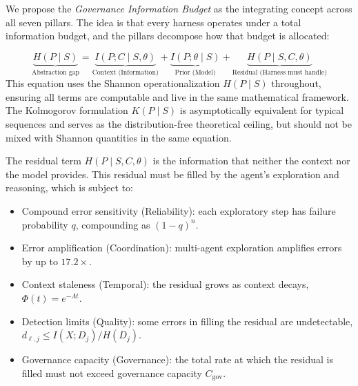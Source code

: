 \documentclass[11pt, a4paper]{googledeepmind}
\begin{document}
We propose the \emph{Governance Information Budget} as the integrating concept across all seven pillars. The idea is that every harness operates under a total information budget, and the pillars decompose how that budget is allocated:

\begin{equation}
\label{eq:gib}
    \underbrace{H(P \mid S)}_{\text{Abstraction gap}} = \underbrace{I(P; C \mid S, \theta)}_{\text{Context (Information)}} + \underbrace{I(P; \theta \mid S)}_{\text{Prior (Model)}} + \underbrace{H(P \mid S, C, \theta)}_{\text{Residual (Harness must handle)}}
\end{equation}
This equation uses the Shannon operationalization $H(P \mid S)$ throughout, ensuring all terms are computable and live in the same mathematical framework. The Kolmogorov formulation $K(P \mid S)$ is asymptotically equivalent for typical sequences \citep{vitanyi2004shannon} and serves as the distribution-free theoretical ceiling, but should not be mixed with Shannon quantities in the same equation.

The residual term $H(P \mid S, C, \theta)$ is the information that neither the context nor the model provides. This residual must be filled by the agent's exploration and reasoning, which is subject to:
\begin{itemize}[nosep]
    \item Compound error sensitivity (Reliability): each exploratory step has failure probability $q$, compounding as $(1-q)^n$.
    \item Error amplification (Coordination): multi-agent exploration amplifies errors by up to $17.2\times$.
    \item Context staleness (Temporal): the residual grows as context decays, $\Phi(t) = e^{-\Lambda t}$.
    \item Detection limits (Quality): some errors in filling the residual are undetectable, $d_{\ell,j} \leq I(X; D_j)/H(D_j)$.
    \item Governance capacity (Governance): the total rate at which the residual is filled must not exceed governance capacity $C_{\text{gov}}$.
\end{itemize}
\end{document}
